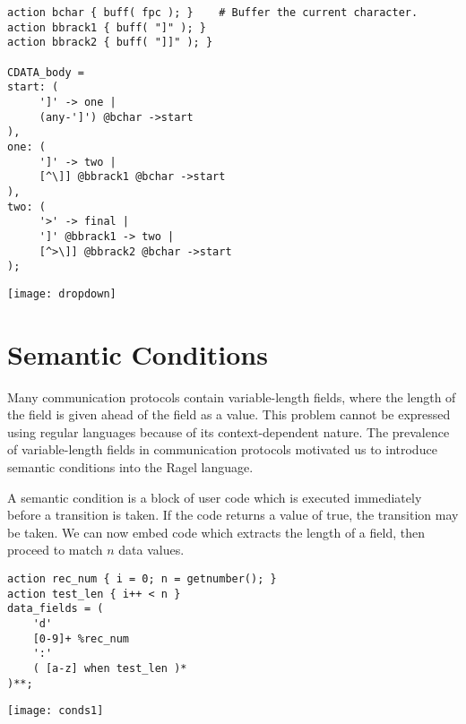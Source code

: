 \documentclass[letterpaper,11pt,oneside]{book}
\newcommand{\graphspace}{\vspace{10pt}}
\newenvironment{inline_code}{\def\baselinestretch{1}\vspace{12pt}\small}{}
\begin{document}
\begin{inline_code}
\begin{verbatim}
action bchar { buff( fpc ); }    # Buffer the current character.
action bbrack1 { buff( "]" ); }
action bbrack2 { buff( "]]" ); }

CDATA_body =
start: (
     ']' -> one |
     (any-']') @bchar ->start
),
one: (
     ']' -> two |
     [^\]] @bbrack1 @bchar ->start
),
two: (
     '>' -> final |
     ']' @bbrack1 -> two |
     [^>\]] @bbrack2 @bchar ->start
);
\end{verbatim}
\end{inline_code}

\graphspace
\begin{center}
\texttt{[image: dropdown]}
\end{center}


\section{Semantic Conditions}
\label{semantic}

Many communication protocols contain variable-length fields, where the length
of the field is given ahead of the field as a value. This
problem cannot be expressed using regular languages because of its
context-dependent nature. The prevalence of variable-length fields in
communication protocols motivated us to introduce semantic conditions into
the Ragel language.

A semantic condition is a block of user code which is executed immediately
before a transition is taken. If the code returns a value of true, the
transition may be taken.  We can now embed code which extracts the length of a
field, then proceed to match $n$ data values.

\begin{inline_code}
\begin{verbatim}
action rec_num { i = 0; n = getnumber(); }
action test_len { i++ < n }
data_fields = (
    'd' 
    [0-9]+ %rec_num 
    ':'
    ( [a-z] when test_len )*
)**;
\end{verbatim}
\end{inline_code}

\begin{center}
\texttt{[image: conds1]}
\end{center}
\graphspace
\end{document}
